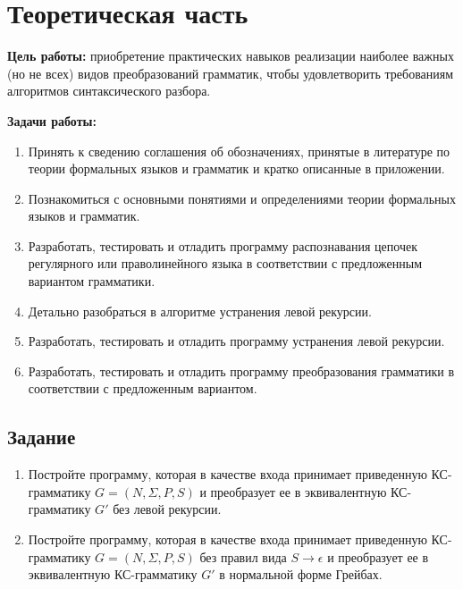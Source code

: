 \chapter{Теоретическая часть}

\textbf{Цель работы:} приобретение практических навыков реализации наиболее важных (но не всех) видов преобразований грамматик, чтобы удовлетворить требованиям алгоритмов синтаксического разбора.

\textbf{Задачи работы:}

\begin{enumerate}
 \item Принять к сведению соглашения об обозначениях, принятые в литературе по теории формальных языков и грамматик и кратко описанные в приложении. 
 \item Познакомиться с основными понятиями и определениями теории формальных языков и грамматик.
 \item Разработать, тестировать и отладить программу распознавания цепочек регулярного или праволинейного языка в соответствии с предложенным вариантом грамматики.
 \item Детально разобраться в алгоритме устранения левой рекурсии.
 \item Разработать, тестировать и отладить программу устранения левой рекурсии.
 \item Разработать, тестировать и отладить программу преобразования грамматики в соответствии с предложенным вариантом.
\end{enumerate}

\section{Задание}

\begin{enumerate}
 \item Постройте программу, которая в качестве входа принимает приведенную КС-грамматику $G = (N, \Sigma, P, S)$ и преобразует ее в эквивалентную КС-грамматику $G'$ без левой рекурсии.
 \item Постройте программу, которая в качестве входа принимает приведенную КС-грамматику $G = (N, \Sigma, P, S)$ без правил вида $S \rightarrow \epsilon$ и преобразует ее в эквивалентную КС-грамматику $G'$ в нормальной форме Грейбах.
\end{enumerate}

   
